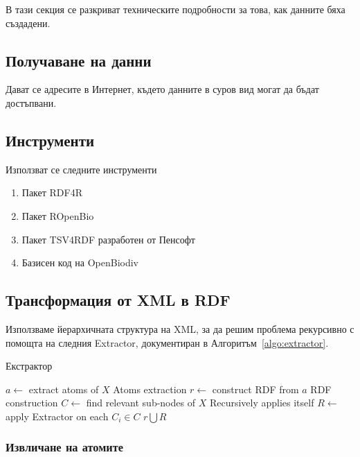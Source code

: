 В тази секция се разкриват техническите подробности за това, как данните бяха създадени.

\subsection{Получаване на данни}

Дават се адресите в Интернет, където данните в суров вид могат да бъдат достъпвани.

\subsection{Инструменти}

Използват се следните инструменти

\begin{enumerate}
\item{Пакет RDF4R}
\item{Пакет ROpenBio}
\item{Пакет TSV4RDF разработен от Пенсофт}
\item{Базисен код на OpenBiodiv}
\end{enumerate}

\subsection{Трансформация от XML в RDF}

Използваме йерархичната структура на XML, за да решим проблема рекурсивно с помощта на следния Extractor, документиран в Алгоритъм~\ref{algo:extractor}.

\begin{algorithm}
\caption{Екстрактор}
\begin{algorithmic}[1]
\State $a \leftarrow$ extract atoms of $X$
\Comment Atoms extraction
\State $r \leftarrow$ construct RDF from $a$
\Comment RDF construction
\State $C \leftarrow$ find relevant sub-nodes of $X$
\Comment Recursively applies itself
\State $R \leftarrow$ apply Extractor on each $C_i \in C$
\State \Return $r \bigcup R$
\EndProcedure
\end{algorithmic}
\label{algo:extractor}
\end{algorithm}

\subsubsection{Извличане на атомите}

